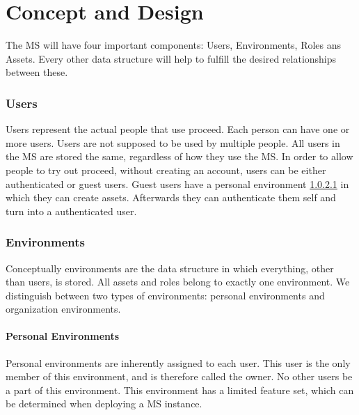 \chapter{Concept and Design}
\label{cha:conceptanddesign}

The MS will have four important components: Users, Environments, Roles ans Assets.
Every other data structure will help to fulfill the desired relationships between these.


\subsection{Users}
\label{cha:conceptanddesign:users}

Users represent the actual people that use proceed.
Each person can have one or more users.
Users are not supposed to be used by multiple people.
All users in the MS are stored the same, regardless of how they use the MS.
In order to allow people to try out proceed,  without creating an account, users
can be either authenticated or guest users.
Guest users have a personal environment \ref{cha:conceptanddesign:environments:personal} %
in which they can create assets.
Afterwards they can authenticate them self and turn into a authenticated user.


%

\subsection{Environments}
\label{cha:conceptanddesign:environments}

Conceptually environments are the data structure in which everything, other than users, is
stored.
All assets and roles belong to exactly one environment.
We distinguish between two types of environments: personal environments and organization
environments.

\subsubsection{Personal Environments}
\label{cha:conceptanddesign:environments:personal}

Personal environments are inherently assigned to each user. 
This user is the only member of this environment, and is therefore called the owner.
No other users be a part of this environment.
This environment has a limited feature set, which can be determined when deploying a MS
instance.

